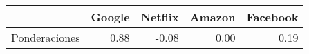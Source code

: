 \begin{table}[ht]
\centering
\begin{tabular}{rrrrr}
  \hline
 & Google & Netflix & Amazon & Facebook \\ 
  \hline
Ponderaciones & 0.88 & -0.08 & 0.00 & 0.19 \\ 
   \hline
\end{tabular}
\end{table}
